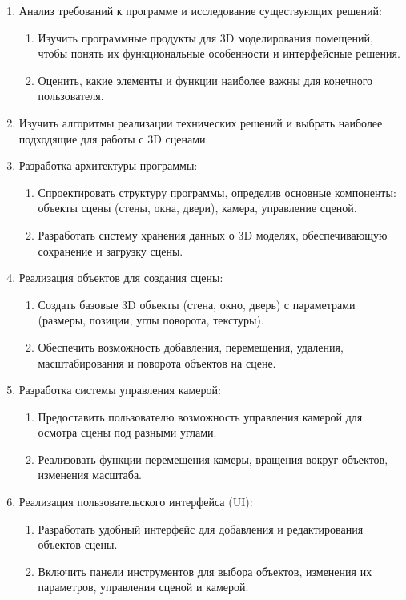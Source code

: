 \begin{enumerate}
    \item Анализ требований к программе и исследование существующих решений:
    \begin{enumerate}
        \item Изучить программные продукты для 3D моделирования помещений, чтобы понять их функциональные особенности и интерфейсные решения.
        \item Оценить, какие элементы и функции наиболее важны для конечного пользователя.
    \end{enumerate}
    
    \item Изучить алгоритмы реализации технических решений и выбрать наиболее подходящие для работы с 3D сценами.
    
    \item Разработка архитектуры программы:
    \begin{enumerate}
        \item Спроектировать структуру программы, определив основные компоненты: объекты сцены (стены, окна, двери), камера, управление сценой.
        \item Разработать систему хранения данных о 3D моделях, обеспечивающую сохранение и загрузку сцены.
    \end{enumerate}
    
    \item Реализация объектов для создания сцены:
    \begin{enumerate}
        \item Создать базовые 3D объекты (стена, окно, дверь) с параметрами (размеры, позиции, углы поворота, текстуры).
        \item Обеспечить возможность добавления, перемещения, удаления, масштабирования и поворота объектов на сцене.
    \end{enumerate}
    
    \item Разработка системы управления камерой:
    \begin{enumerate}
        \item Предоставить пользователю возможность управления камерой для осмотра сцены под разными углами.
        \item Реализовать функции перемещения камеры, вращения вокруг объектов, изменения масштаба.
    \end{enumerate}
    
    \item Реализация пользовательского интерфейса (UI):
    \begin{enumerate}
        \item Разработать удобный интерфейс для добавления и редактирования объектов сцены.
        \item Включить панели инструментов для выбора объектов, изменения их параметров, управления сценой и камерой.
    \end{enumerate}
    

\end{enumerate}
